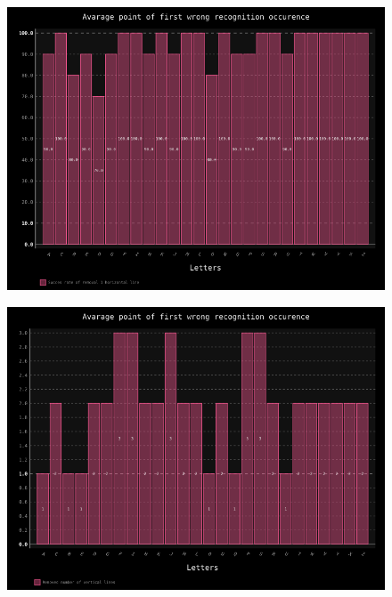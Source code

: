 \documentclass[a4paper]{article}
\begin{document}
\begin{figure}[h!]
	\centering
	\includegraphics[scale=0.7,keepaspectratio=true]{Charts/HorLineTestPlanResultsChart_ClasifierTester.png}	
	\caption{}
	\label{hor_line_clas}
\end{figure}

\begin{figure}[h!]
	\centering
	\includegraphics[scale=0.7,keepaspectratio=true]{Charts/LinesVerTestPlanResultsChart_NormalTester.png}	
	\caption{}
	\label{ver_lines_trans}
\end{figure}
\end{document}
